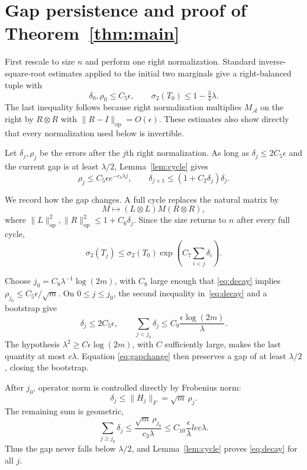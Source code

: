 \documentclass[11pt]{article}
\newcommand{\Acal}{\mathcal A}
\newcommand{\op}{\mathrm{op}}
\begin{document}
\section{Gap persistence and proof of Theorem~\ref{thm:main}}

First rescale to size $n$ and perform one right normalization.  Standard
inverse-square-root estimates applied to the initial two marginals give a
right-balanced tuple with
\begin{equation}\label{eq:init}
 \delta_0,\rho_0\le C_5\epsilon,\qquad
 \sigma_2(T_0)\le1-\tfrac34\lambda.
\end{equation}
The last inequality follows because right normalization multiplies
$M_{\Acal}$ on the right by $R\otimes R$ with
$\|R-I\|_{\op}=O(\epsilon)$.  These estimates also show directly that every
normalization used below is invertible.

Let $\delta_j,\rho_j$ be the errors after the $j$th right normalization.
As long as $\delta_j\le2C_5\epsilon$ and the current gap is at least
$\lambda/2$, Lemma~\ref{lem:cycle} gives
\begin{equation}\label{eq:decay}
 \rho_j\le C_5\epsilon e^{-c_3\lambda j},\qquad
 \delta_{j+1}\le(1+C_2\delta_j)\delta_j.
\end{equation}

We record how the gap changes.  A full cycle replaces the natural matrix by
\[
 M\longmapsto(L\otimes L)M(R\otimes R),
\]
where $\|L\|_{\op}^2,\|R\|_{\op}^2\le1+C_6\delta_j$.  Since the size returns
to $n$ after every full cycle,
\begin{equation}\label{eq:gapchange}
 \sigma_2(T_j)\le \sigma_2(T_0)
 \exp\!\left(C_7\sum_{i<j}\delta_i\right).
\end{equation}

Choose
$j_0=C_8\lambda^{-1}\log(2m)$, with $C_8$ large enough that
\eqref{eq:decay} implies $\rho_{j_0}\le C_5\epsilon/\sqrt m$.
On $0\le j\le j_0$, the second inequality in~\eqref{eq:decay} and a bootstrap
give
\[
 \delta_j\le2C_5\epsilon,\qquad
 \sum_{j<j_0}\delta_j
 \le C_9\frac{\epsilon\log(2m)}{\lambda}.
\]
The hypothesis $\lambda^2\ge C\epsilon\log(2m)$, with $C$ sufficiently
large, makes the last quantity at most $c\lambda$.  Equation
\eqref{eq:gapchange} then preserves a gap of at least $\lambda/2$, closing the
bootstrap.

After $j_0$, operator norm is controlled directly by Frobenius norm:
\[
 \delta_j\le\|H_j\|_F=\sqrt m\,\rho_j.
\]
The remaining sum is geometric,
\[
 \sum_{j\ge j_0}\delta_j
 \le \frac{\sqrt m\,\rho_{j_0}}{c_3\lambda}
 \le C_{10}\frac{\epsilon}{\lambda}le c\lambda.
\]
Thus the gap never falls below $\lambda/2$, and Lemma~\ref{lem:cycle} proves
\eqref{eq:decay} for all $j$.
\end{document}
